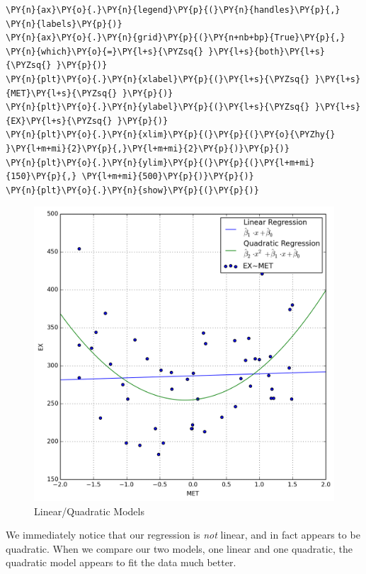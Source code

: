 \documentclass[10pt]{article}\usepackage[]{graphicx}\usepackage[]{xcolor}
\begin{document}
\begin{Verbatim}[commandchars=\\\{\}]
\PY{n}{ax}\PY{o}{.}\PY{n}{legend}\PY{p}{(}\PY{n}{handles}\PY{p}{,} \PY{n}{labels}\PY{p}{)}
\PY{n}{ax}\PY{o}{.}\PY{n}{grid}\PY{p}{(}\PY{n+nb+bp}{True}\PY{p}{,} \PY{n}{which}\PY{o}{=}\PY{l+s}{\PYZsq{} }\PY{l+s}{both}\PY{l+s}{\PYZsq{} }\PY{p}{)}
\PY{n}{plt}\PY{o}{.}\PY{n}{xlabel}\PY{p}{(}\PY{l+s}{\PYZsq{} }\PY{l+s}{MET}\PY{l+s}{\PYZsq{} }\PY{p}{)}
\PY{n}{plt}\PY{o}{.}\PY{n}{ylabel}\PY{p}{(}\PY{l+s}{\PYZsq{} }\PY{l+s}{EX}\PY{l+s}{\PYZsq{} }\PY{p}{)}
\PY{n}{plt}\PY{o}{.}\PY{n}{xlim}\PY{p}{(}\PY{p}{(}\PY{o}{\PYZhy{} }\PY{l+m+mi}{2}\PY{p}{,}\PY{l+m+mi}{2}\PY{p}{)}\PY{p}{)}
\PY{n}{plt}\PY{o}{.}\PY{n}{ylim}\PY{p}{(}\PY{p}{(}\PY{l+m+mi}{150}\PY{p}{,} \PY{l+m+mi}{500}\PY{p}{)}\PY{p}{)}
\PY{n}{plt}\PY{o}{.}\PY{n}{show}\PY{p}{(}\PY{p}{)}
\end{Verbatim}

    \begin{figure}[H]
        \centering
        \includegraphics[scale=0.6]{./img/lin_quad.png}
        \caption{Linear/Quadratic Models}
        \label{fig:linquad}
    \end{figure}
    
    We immediately notice that our regression is \emph{not} linear, and in fact appears to be quadratic. When we compare
    our two models, one linear and one quadratic, the quadratic model appears to fit the data much better.
\end{document}
